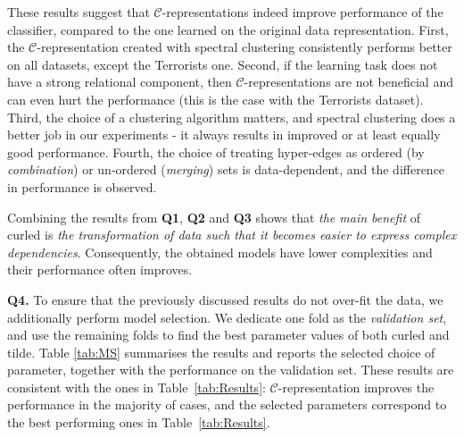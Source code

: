 These results suggest that $\mathcal{C}$-representations indeed improve performance of the classifier, compared to the one learned on the original data representation.
First, the $\mathcal{C}$-representation created with spectral clustering consistently performs better on all datasets, except the Terrorists one.
Second, if the learning  task does not have a strong relational component, then $\mathcal{C}$-representations are not beneficial and can even hurt the performance (this is the case with the Terrorists dataset).
Third, the choice of a clustering algorithm matters, and spectral clustering does a better job in our experiments - it always results in improved or at least equally good performance.
Fourth, the choice of treating hyper-edges as ordered (by \textit{combination}) or un-ordered (\textit{merging}) sets is data-dependent, and the difference in performance is observed.


Combining the results from \textbf{Q1}, \textbf{Q2} and \textbf{Q3} shows that \textit{the main benefit} of \gls{curled} is \textit{the transformation of data such that it becomes easier to express complex dependencies}.
Consequently, the obtained models have lower complexities and  their performance often improves.


\textbf{Q4.} To ensure that the previously discussed results do not over-fit the data, we additionally perform model selection.
We dedicate one fold as the \textit{validation set}, and use the remaining folds to find the best parameter values of both \gls{curled} and \gls{tilde}.
Table \ref{tab:MS} summarises the results and reports the selected choice of parameter, together with the performance on the validation set.
These results are consistent with the ones in Table~\ref{tab:Results}: $\mathcal{C}$-representation improves the performance in the majority of cases, and the selected parameters correspond to the best performing ones in Table~\ref{tab:Results}.

